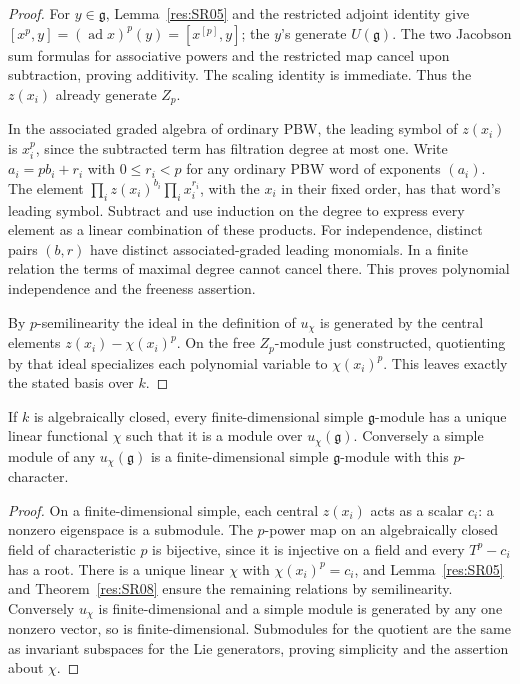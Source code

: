 \begin{proof}
For \(y\in\mathfrak g\), Lemma~\ref{res:SR05} and the
restricted adjoint identity give
\([x^p,y]=(\operatorname{ad}x)^p(y)=[x^{[p]},y]\);
the \(y\)'s generate \(U(\mathfrak g)\). The two
Jacobson sum formulas for associative powers and the
restricted map cancel upon subtraction, proving additivity.
The scaling identity is immediate. Thus the \(z(x_i)\)
already generate \(Z_p\).

In the associated graded algebra of ordinary PBW,
the leading symbol of \(z(x_i)\) is \(x_i^p\), since
the subtracted term has filtration degree at most one.
Write \(a_i=p b_i+r_i\) with \(0\le r_i<p\) for any
ordinary PBW word of exponents \((a_i)\).
The element
\(\prod_i z(x_i)^{b_i}\prod_i x_i^{r_i}\),
with the \(x_i\) in their fixed order, has that word's
leading symbol. Subtract and use induction on the degree
to express every element as a linear combination of these
products. For independence, distinct pairs \((b,r)\)
have distinct associated-graded leading monomials.
In a finite relation the terms of maximal degree cannot
cancel there. This proves polynomial independence and
the freeness assertion.

By \(p\)-semilinearity the ideal in the definition of
\(u_\chi\) is generated by the central elements
\(z(x_i)-\chi(x_i)^p\). On the free \(Z_p\)-module just
constructed, quotienting by that ideal specializes each
polynomial variable to \(\chi(x_i)^p\). This leaves exactly
the stated basis over \(k\).
\end{proof}

\begin{corollary}
\label{res:SR09}
If \(k\) is algebraically closed, every finite-dimensional simple
\(\mathfrak g\)-module has a unique linear functional \(\chi\)
such that it is a module over \(u_\chi(\mathfrak g)\).
Conversely a simple module of any \(u_\chi(\mathfrak g)\) is
a finite-dimensional simple \(\mathfrak g\)-module with this
\(p\)-character.
\end{corollary}

\begin{proof}
On a finite-dimensional simple, each central \(z(x_i)\)
acts as a scalar \(c_i\): a nonzero eigenspace is a
submodule. The \(p\)-power map on an algebraically closed
field of characteristic \(p\) is bijective, since it
is injective on a field and every \(T^p-c_i\) has a root.
There is a unique linear \(\chi\) with
\(\chi(x_i)^p=c_i\), and Lemma~\ref{res:SR05} and
Theorem~\ref{res:SR08} ensure the remaining relations
by semilinearity. Conversely \(u_\chi\) is finite-dimensional
and a simple module is generated by any one nonzero vector,
so is finite-dimensional. Submodules for the quotient are
the same as invariant subspaces for the Lie generators,
proving simplicity and the assertion about \(\chi\).
\end{proof}

